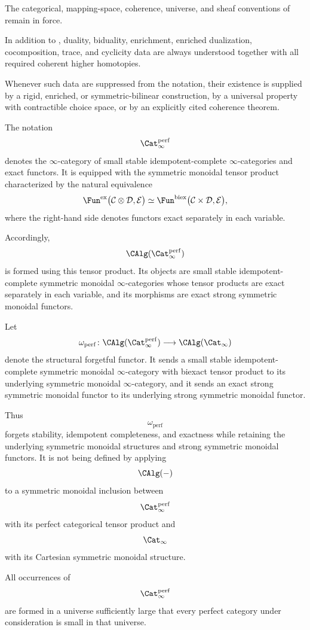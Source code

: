 The categorical, mapping-space, coherence, universe, and sheaf conventions
of
remain in force.

\begin{convention}
\label{conv:rigid-higher-coherence}
In addition to
,
duality, biduality, enrichment, enriched dualization, cocomposition, trace,
and cyclicity data are always understood together with all required
coherent higher homotopies.

Whenever such data are suppressed from the notation, their existence is
supplied by a rigid, enriched, or symmetric-bilinear construction, by a
universal property with contractible choice space, or by an explicitly
cited coherence theorem.
\end{convention}

\begin{convention}
\label{conv:perfect-categorical-tensor-product}
The notation
\[
    \Cat_\infty^{\mathrm{perf}}
\]
denotes the $\infty$-category of small stable idempotent-complete
$\infty$-categories and exact functors. It is equipped with the symmetric
monoidal tensor product characterized by the natural equivalence
\[
    \Fun^{\mathrm{ex}}
    \bigl(
        \mathcal C\otimes\mathcal D,
        \mathcal E
    \bigr)
    \simeq
    \Fun^{\mathrm{biex}}
    \bigl(
        \mathcal C\times\mathcal D,
        \mathcal E
    \bigr),
\]
where the right-hand side denotes functors exact separately in each
variable.

Accordingly,
\[
    \CAlg(\Cat_\infty^{\mathrm{perf}})
\]
is formed using this tensor product. Its objects are small stable
idempotent-complete symmetric monoidal $\infty$-categories whose tensor
products are exact separately in each variable, and its morphisms are
exact strong symmetric monoidal functors.

Let
\[
    \omega_{\mathrm{perf}}
    \colon
    \CAlg(\Cat_\infty^{\mathrm{perf}})
    \longrightarrow
    \CAlg(\Cat_\infty)
\]
denote the structural forgetful functor. It sends a small stable
idempotent-complete symmetric monoidal $\infty$-category with biexact
tensor product to its underlying symmetric monoidal $\infty$-category,
and it sends an exact strong symmetric monoidal functor to its underlying
strong symmetric monoidal functor.

Thus
\[
    \omega_{\mathrm{perf}}
\]
forgets stability, idempotent completeness, and exactness while retaining
the underlying symmetric monoidal structures and strong symmetric
monoidal functors. It is not being defined by applying
\[
    \CAlg(-)
\]
to a symmetric monoidal inclusion between
\[
    \Cat_\infty^{\mathrm{perf}}
\]
with its perfect categorical tensor product and
\[
    \Cat_\infty
\]
with its Cartesian symmetric monoidal structure.

All occurrences of
\[
    \Cat_\infty^{\mathrm{perf}}
\]
are formed in a universe sufficiently large that every perfect category
under consideration is small in that universe.
\end{convention}

